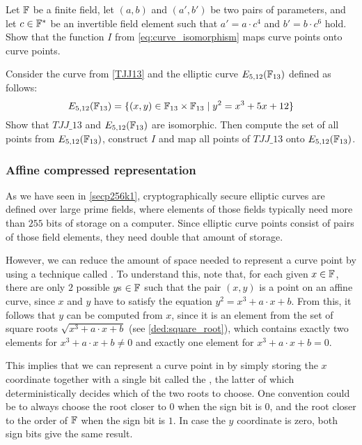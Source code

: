 \begin{exercise}
Let $\mathbb{F}$ be a finite field, let $(a,b)$ and $(a',b')$ be two pairs of parameters, and let $c\in \mathbb{F}^*$ be an invertible field element such that $a' = a\cdot c^4$ and $b' = b\cdot c^6$ hold. Show that the function $I$ from \eqref{eq:curve_isomorphism} maps curve points onto curve points.
\end{exercise}

\begin{exercise}
\label{ex:isomorphic_TJJ13} Consider the  curve from \examplename{} \ref{TJJ13} and the elliptic curve $E_{5,12}(\mathbb{F}_{13})$ defined as follows:
\begin{equation}
E_{5,12}(\mathbb{F}_{13}) = \{ (x,y)\in \mathbb{F}_{13}\times \mathbb{F}_{13}\;|\; y^2 = x^3 + 5x +12\}
\end{equation}
Show that $TJJ\_13$ and $E_{5,12}(\mathbb{F}_{13})$ are isomorphic. Then compute the set of all points from $E_{5,12}(\mathbb{F}_{13})$, construct $I$ and map all points of $TJJ\_13$ onto $E_{5,12}(\mathbb{F}_{13})$.
\end{exercise}

\subsubsection{Affine compressed representation}
\label{sec:affine_point_compression}
As we have seen in \examplename{} \ref{secp256k1}, cryptographically secure elliptic curves are defined over large prime fields, where elements of those fields typically need more than $255$ bits of storage on a computer. Since elliptic curve points consist of pairs of those field elements, they need double that amount of storage.

However, we can reduce the amount of space needed to represent a curve point by using a technique called . To understand this, note that, for each given $x\in\mathbb{F}$, there are only $2$ possible $y$s $\in \mathbb{F}$ such that the pair $(x,y)$ is a point on an affine  curve, since $x$ and $y$ have to satisfy the equation $y^2 = x^3 + a\cdot x + b$. From this, it follows that $y$ can be computed from $x$, since it is an element from the set of square roots $\sqrt{x^3 + a\cdot x +b}$ (see \ref{ded:square_root}), which contains exactly two elements for $x^3 + a\cdot x +b\neq 0$ and exactly one element for $x^3 + a\cdot x +b=0$. 

This implies that we can represent a curve point in  by simply storing the $x$ coordinate together with a single bit called the , the latter of which deterministically decides which of the two roots to choose. One convention could be to always choose the root closer to $0$ when the sign bit is $0$, and the root closer to the order of $\mathbb{F}$ when the sign bit is $1$. In case the $y$ coordinate is zero, both sign bits give the same result.

